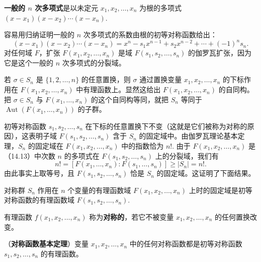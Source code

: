 \begin{definition}
\textbf{一般的 \(n\) 次多项式}是以未定元 \(x_1, x_2, \ldots, x_n\) 为根的多项式 \((x-x_1)(x-x_2)\cdots(x-x_n)\).
\end{definition}

容易用归纳证明一般的 \(n\) 次多项式的系数由根的初等对称函数给出：
\begin{equation}
(x-x_1)(x-x_2)\cdots(x-x_n) = x^n-s_1x^{n-1}+s_2x^{n-2}+\cdots+(-1)^ns_n. \tag{14.13}
\end{equation}
对任何域 \(F\)，扩张 \(F(x_1, x_2, \ldots, x_n)\) 是域 \(F(s_1, s_2, \ldots, s_n)\) 的伽罗瓦扩张，因为它是这个一般的 \(n\) 次多项式的分裂域。

若 \(\sigma \in S_n\) 是 \(\{1, 2, \ldots, n\}\) 的任意置换，则 \(\sigma\) 通过置换变量 \(x_1, x_2, \ldots, x_n\) 的下标作用在 \(F(x_1, x_2, \ldots, x_n)\) 中有理函数上。显然这给出 \(F(x_1, x_2, \ldots, x_n)\) 的自同构。把 \(\sigma \in S_n\) 与 \(F(x_1, \ldots, x_n)\) 的这个自同构等同，就把 \(S_n\) 等同于 \(\operatorname{Aut}(F(x_1, \ldots, x_n))\) 的子群。

初等对称函数 \(s_1, s_2, \ldots, s_n\) 在下标的任意置换下不变（这就是它们被称为对称的原因），这表明子域 \(F(s_1, s_2, \ldots, s_n)\) 含于 \(S_n\) 的固定域中。由伽罗瓦理论基本定理，\(S_n\) 的固定域在 \(F(x_1, x_2, \ldots, x_n)\) 中的指数恰为 \(n!\). 由于 \(F(x_1, x_2, \ldots, x_n)\) 是（14.13）中次数 \(n\) 的多项式在 \(F(s_1, s_2, \ldots, s_n)\) 上的分裂域，我们有
\begin{equation}
n! = [F(x_1, \ldots, x_n):F(s_1, \ldots, s_n)] \geq |S_n| = n!. \tag{14.14}
\end{equation}
由此事实上取等号，且 \(F(s_1, s_2, \ldots, s_n)\) 恰是 \(S_n\) 的固定域。这证明了下面结果。

\begin{proposition}\label{pro:14.30}
对称群 \(S_n\) 作用在 \(n\) 个变量的有理函数域 \(F(x_1, x_2, \ldots, x_n)\) 上时的固定域是初等对称函数的有理函数域 \(F(s_1, s_2, \ldots, s_n)\).
\end{proposition}

\begin{definition}
有理函数 \(f(x_1, x_2, \ldots, x_n)\) 称为\textbf{对称的}，若它不被变量 \(x_1, x_2, \ldots, x_n\) 的任何置换改变。
\end{definition}

\begin{corollary}\label{cor:14.31}
（\textbf{对称函数基本定理}）变量 \(x_1, x_2, \ldots, x_n\) 中的任何对称函数都是初等对称函数 \(s_1, s_2, \ldots, s_n\) 的有理函数。
\end{corollary}


